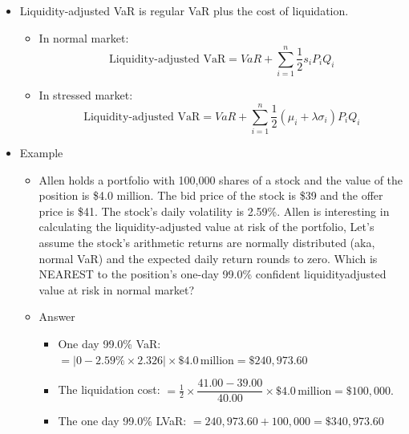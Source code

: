 \begin{itemize}
\begin{itemize}
        \begin{itemize}
        \item 99\% expected transaction cost per unit of bond A:
        \[
        = \frac{1}{2} \times (10\% + 2.33 \times 6\%) \times (40000 \div 400) \times 1 = 11.99
        \]
        \item 99\% spread risk factor of bond B:
        \[
        = \frac{1}{2} \times (20\% + 2.33 \times 8\%) = 0.1932
        \]
        \item Cost of liquidation of the portfolio:
        \(
        = \sum_{i=1}^{n} \frac{1}{2} (\mu_i + \lambda \sigma_i) P_i Q_i
        \)
        \[
        = \frac{1}{2} \times (10\% + 2.33 \times 6\%) \times 40000 + \frac{1}{2} \times (20\% + 2.33 \times 8\%) \times 46000 = 13683.20
        \]
        \end{itemize}
    \end{itemize}
\item Liquidity-adjusted VaR is regular VaR plus the cost of liquidation.
    \begin{itemize}
    \item In normal market:
    \[
\text{Liquidity-adjusted VaR} = VaR + \sum_{i=1}^{n} \frac{1}{2} s_i P_i Q_i
\]
    \item In stressed market:
    \[
\text{Liquidity-adjusted VaR} = VaR + \sum_{i=1}^{n} \frac{1}{2} (\mu_i + \lambda \sigma_i) P_i Q_i
\]
    \end{itemize}
\item Example
    \begin{itemize}
    \item Allen holds a portfolio with 100,000 shares of a stock and the value of the position is \$4.0 million. The bid price of the stock is \$39 and the offer price is \$41. The stock's daily volatility is 2.59\%. Allen is interesting in calculating the liquidity-adjusted value at risk of the portfolio, Let's assume the stock's arithmetic returns are normally distributed (aka, normal VaR) and the expected daily return rounds to zero. Which is NEAREST to the position's one-day 99.0\% confident liquidityadjusted value at risk in normal market?
    \item Answer
        \begin{itemize}
        \item One day 99.0\% VaR:
        \(
        = \left| 0 - 2.59\% \times 2.326 \right| \times \$4.0\,\text{million} = \$240{,}973.60
        \)
        \item The liquidation cost:
        \(
        = \frac{1}{2} \times \dfrac{41.00 - 39.00}{40.00} \times \$4.0\,\text{million} = \$100{,}000.
        \)
        \item The one day 99.0\% LVaR:
        \(
        = 240{,}973.60 + 100{,}000 = \$340{,}973.60
        \)
        \end{itemize}
    

\end{itemize}
\end{itemize}
